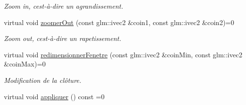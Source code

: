 \begin{DoxyCompactItemize}
\begin{DoxyCompactList}\small\item\em Zoom in, c\textquotesingle{}est-\/à-\/dire un agrandissement. \end{DoxyCompactList}\item 
\hypertarget{classvue_1_1_projection_ae96d44a2ab4199dead6401c9e3d56687}{}virtual void \hyperlink{classvue_1_1_projection_ae96d44a2ab4199dead6401c9e3d56687}{zoomer\+Out} (const glm\+::ivec2 \&coin1, const glm\+::ivec2 \&coin2)=0\label{classvue_1_1_projection_ae96d44a2ab4199dead6401c9e3d56687}

\begin{DoxyCompactList}\small\item\em Zoom out, c\textquotesingle{}est-\/à-\/dire un rapetissement. \end{DoxyCompactList}\item 
\hypertarget{classvue_1_1_projection_a27a880285b985a370000944044f07a21}{}virtual void \hyperlink{classvue_1_1_projection_a27a880285b985a370000944044f07a21}{redimensionner\+Fenetre} (const glm\+::ivec2 \&coin\+Min, const glm\+::ivec2 \&coin\+Max)=0\label{classvue_1_1_projection_a27a880285b985a370000944044f07a21}

\begin{DoxyCompactList}\small\item\em Modification de la clôture. \end{DoxyCompactList}\item 
\hypertarget{classvue_1_1_projection_ad25f7ba8515073ef700eac3c737e273a}{}virtual void \hyperlink{classvue_1_1_projection_ad25f7ba8515073ef700eac3c737e273a}{appliquer} () const  =0\label{classvue_1_1_projection_ad25f7ba8515073ef700eac3c737e273a}


\end{DoxyCompactItemize}
